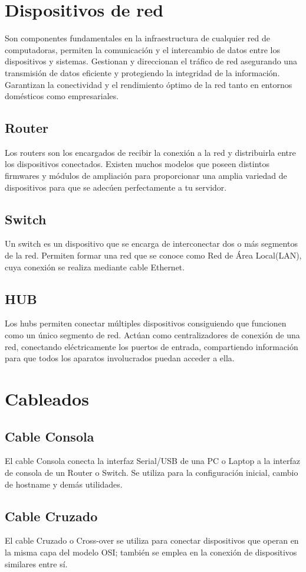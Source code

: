 \documentclass{article}
\begin{document}
\section{Dispositivos de red}
Son componentes fundamentales en la infraestructura de cualquier red de computadoras, permiten la comunicación y el intercambio de datos entre los dispositivos y sistemas. Gestionan y direccionan el tráfico de red asegurando una transmisión de datos eficiente y protegiendo la integridad de la información. Garantizan la conectividad y el rendimiento óptimo de la red tanto en entornos domésticos como empresariales.
\subsection{Router}
Los routers son los encargados de recibir la conexión a la red y distribuirla entre los dispositivos conectados. Existen muchos modelos que poseen distintos firmwares y módulos de ampliación para proporcionar una amplia variedad de dispositivos para que se adecúen perfectamente a tu servidor.
\subsection{Switch}
Un switch es un dispositivo que se encarga de interconectar dos o más segmentos de la red. Permiten formar una red que se conoce como Red de Área Local(LAN), cuya conexión se realiza mediante cable Ethernet. 
\subsection{HUB}
Los hubs permiten conectar múltiples dispositivos consiguiendo que funcionen como un único segmento de red. Actúan como centralizadores de conexión de una red, conectando eléctricamente los puertos de entrada, compartiendo información para que todos los aparatos involucrados puedan acceder a ella.

\section{Cableados}
\subsection{Cable Consola}
El cable Consola conecta la interfaz Serial/USB de una PC o Laptop a la interfaz de consola de un Router o Switch. Se utiliza para la configuración inicial, cambio de hostname y demás utilidades.
\subsection{Cable Cruzado}
El cable Cruzado o Cross-over se utiliza para conectar dispositivos que operan en la misma capa del modelo OSI; también se emplea en la conexión de dispositivos similares entre sí.
\end{document}
